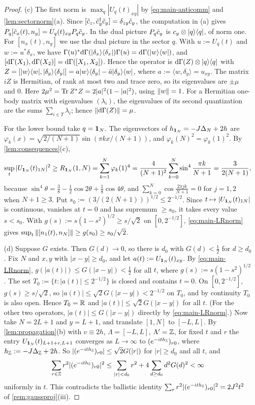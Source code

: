 \begin{proof}
(c) The first norm is $\max_q|U_q(t)_{xy}|$ by \eqref{eq:main-anticomm} and \cref{lem:sectornorm}(a).  Since
$[\tilde c_z,\tilde c_y^\dagger\tilde c_y]=\delta_{zy}\tilde c_y$, the computation in (a) gives
$P_q[\tilde c_x(t),n_y]=U_q(t)_{xy}P_q\tilde c_y$.  In the dual picture $P_q\tilde c_y$ is $c_y\otimes|q\rangle\langle q|$, of norm one.
For $[n_x(t),n_y]$ we use the dual picture in the sector $q$.  With $u:=U_q(t)$ and $w:=u^*\delta_x$, we have
$\Gamma(u)^*\mathrm{d}\Gamma(|\delta_x\rangle\langle \delta_x|)\Gamma(u)=\mathrm{d}\Gamma(|w\rangle\langle w|)$, and
$[\mathrm{d}\Gamma(X_1),\mathrm{d}\Gamma(X_2)]=\mathrm{d}\Gamma([X_1,X_2])$.  Hence the operator is $\mathrm{d}\Gamma(Z)\otimes|q\rangle\langle q|$ with
$Z=[|w\rangle\langle w|,|\delta_y\rangle\langle \delta_y|]=a|w\rangle\langle \delta_y|-\bar a|\delta_y\rangle\langle w|$, where
$a:=\langle w,\delta_y\rangle=u_{xy}$.  The matrix $iZ$ is Hermitian, of rank at most two and trace zero, so
its eigenvalues are $\pm\mu$ and $0$.  Here $2\mu^2=\operatorname{Tr} Z^*Z=2|a|^2(1-|a|^2)$, using $\left\|w\right\|=1$.  For a
Hermitian one-body matrix with eigenvalues $(\lambda_i)$, the eigenvalues of its second quantization are the
sums $\sum_{i\in T}\lambda_i$; hence $\left\|\mathrm{d}\Gamma(Z)\right\|=\mu$.

For the lower bound take $q=\mathbf{1}_N$.  The eigenvectors of $h_{\mathbf{1}_N}=-J\Delta_N+2h$ are
$\varphi_k(x)=\sqrt{2/(N+1)}\sin(\pi kx/(N+1))$, and $\varphi_k(N)^2=\varphi_k(1)^2$.  By \cref{lem:consequences}(c),
\[
  \sup_t|U_{\mathbf{1}_N}(t)_{1N}|^2\ge R_{\mathbf{1}_N}(1,N)=\sum_{k=1}^N\varphi_k(1)^4=\frac4{(N+1)^2}\sum_{k=0}^{N}\sin^4\frac{\pi k}{N+1}
  =\frac{3}{2(N+1)},
\]
because $\sin^4\theta=\frac38-\frac12\cos2\theta+\frac18\cos4\theta$, and
$\sum_{k=0}^{N}\cos\frac{2\pi jk}{N+1}=0$ for $j=1,2$ when $N+1\ge3$.  Put $s_0:=(3/(2(N+1)))^{1/2}\le2^{-1/2}$.
Since $t\mapsto|U_{\mathbf{1}_N}(t)_{1N}|$ is continuous, vanishes at $t=0$ and has supremum $\ge s_0$, it takes every value
$s<s_0$.  With $g(s):=s(1-s^2)^{1/2}\ge s/\sqrt2$ on $[0,2^{-1/2}]$, \eqref{eq:main-LRnorm} gives
$\sup_t\left\|[n_1(t),n_N]\right\|\ge g(s_0)\ge s_0/\sqrt2$.

(d) Suppose $G$ exists.  Then $G(d)\to0$, so there is $d_0$ with $G(d)<\frac12$ for $d\ge d_0$.  Fix $N$ and
$x,y$ with $|x-y|\ge d_0$, and let $a(t):=U_{\mathbf{1}_N}(t)_{xy}$.  By \eqref{eq:main-LRnorm},
$g(|a(t)|)\le G(|x-y|)<\frac12$ for all $t$, where $g(s):=s(1-s^2)^{1/2}$.  The set
$T_0:=\{t:|a(t)|\le2^{-1/2}\}$ is closed and contains $t=0$.  On $[0,2^{-1/2}]$, $g(s)\ge s/\sqrt2$, so
$|a(t)|\le\sqrt2G(|x-y|)<2^{-1/2}$ on $T_0$, and by continuity $T_0$ is also open.  Hence $T_0=\mathbb{R}$ and
$|a(t)|\le\sqrt2G(|x-y|)$ for all $t$.  (For the other two operators, $|a(t)|\le G(|x-y|)$ directly by
\eqref{eq:main-LRnorm}.)  Now take $N=2L+1$ and $y=L+1$, and translate $[1,N]$ to $[-L,L]$.  By
\cref{lem:propagation}(b) with $v\equiv2h$, $\Lambda=[-L,L]$, $\Lambda'=\mathbb{Z}$, for fixed $t$ and $r$ the entry
$U_{\mathbf{1}_N}(t)_{L+1+r,L+1}$ converges as $L\to\infty$ to $(e^{-ith_{\mathbb{Z}}})_{r0}$, where $h_{\mathbb{Z}}:=-J\Delta_{\mathbb{Z}}+2h$.  So
$|(e^{-ith_{\mathbb{Z}}})_{r0}|\le\sqrt2G(|r|)$ for $|r|\ge d_0$ and all $t$, and
\[
  \sum_{r\in\mathbb{Z}}r^2|(e^{-ith_{\mathbb{Z}}})_{r0}|^2\le\sum_{|r|<d_0}r^2+4\sum_{d\ge d_0}d^2G(d)^2<\infty
\]
uniformly in $t$.  This contradicts the ballistic identity $\sum_rr^2|(e^{-ith_{\mathbb{Z}}})_{r0}|^2=2J^2t^2$ of
\cref{rem:gaussproj}(iii).
\end{proof}

